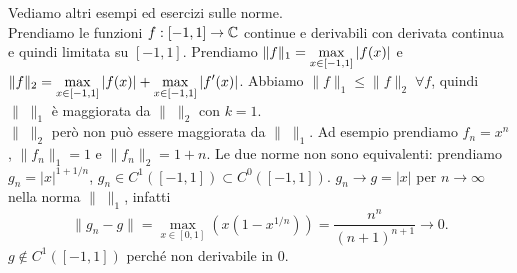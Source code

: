 Vediamo altri esempi ed esercizi sulle norme.\\
Prendiamo le funzioni $f: [-1, 1] \to \mathbb C$ continue e derivabili con
derivata continua e quindi limitata su $[-1, 1]$.
Prendiamo $ \displaystyle \|f\|_1 = \max_{x \in [-1, 1]} {\left|f(x)\right|}$ e $ \displaystyle
\|f\|_2 = \max_{x \in [-1, 1]} {\left|f(x)\right|} + \max_{x \in [-1, 1]} {\left|f'(x)\right|}$.
Abbiamo $\|f\|_1 \leq \|f\|_2 \; \forall f$, quindi $\| \; \|_1$ è maggiorata
da $\| \; \|_2$ con $k = 1$.\\
$\| \; \|_2$ però non può essere maggiorata da $\| \; \|_1$.
Ad esempio prendiamo $f_n = x^n$, $\|f_n\|_1 = 1$ e $\|f_n\|_2= 1 + n$.
Le due norme non sono equivalenti: prendiamo $g_n=|x|^{1+1/n}$,
$g_n\in C^1([-1, 1]) \subset C^0([-1, 1])$. $g_n \to g = |x|$ 
per $n \to \infty$ nella norma $\| \; \|_1$, infatti
\[
\|g_n - g\| = \max_{x \in [0,1] }(x(1 - x^{1/n})) = \frac{n^n}
{(n+1)^{n+1}} \to 0
.\]
$g\notin C^1([-1,1])$ perché non derivabile in $0$.
